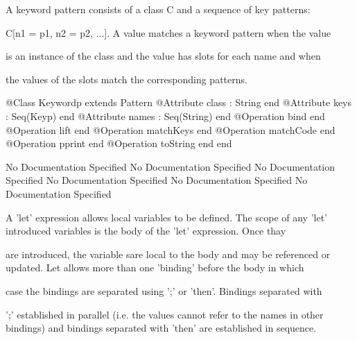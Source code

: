       A keyword pattern consists of a class C and a sequence of key patterns:

      C[n1 = p1, n2 = p2, ...]. A value matches a keyword pattern when the value

      is an instance of the class and the value has slots for each name and when

      the values of the slots match the corresponding patterns.
\begin{Interface}
@Class Keywordp extends Pattern
  @Attribute class : String end
  @Attribute keys : Seq(Keyp) end
  @Attribute names : Seq(String) end
  @Operation bind end
  @Operation lift end
  @Operation matchKeys end
  @Operation matchCode end
  @Operation pprint end
  @Operation toString end
end
\end{Interface}
No Documentation Specified
No Documentation Specified
No Documentation Specified
No Documentation Specified
No Documentation Specified
No Documentation Specified

      A 'let' expression allows local variables to be defined. The scope of any 
      'let' introduced variables is the body of the 'let' expression. Once thay

      are introduced, the variable sare local to the body and may be referenced 
      or updated. Let allows more than one 'binding' before the body in which

      case the bindings are separated using ';' or 'then'. Bindings separated with

      ';' established in parallel (i.e. the values cannot refer to the names in other 
      bindings) and bindings separated with 'then' are established in sequence.
      
